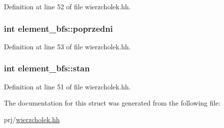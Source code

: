 \-Definition at line 52 of file wierzcholek.\-hh.

\hypertarget{structelement__bfs_a94b882f6922be485d6942f71c29e581d}{
\subsubsection[{poprzedni}]{\setlength{\rightskip}{0pt plus 5cm}int {\bf element\-\_\-bfs\-::poprzedni}}}\label{structelement__bfs_a94b882f6922be485d6942f71c29e581d}


\-Definition at line 53 of file wierzcholek.\-hh.

\hypertarget{structelement__bfs_aa654df64808f513f41d0349571e4b90e}{
\subsubsection[{stan}]{\setlength{\rightskip}{0pt plus 5cm}int {\bf element\-\_\-bfs\-::stan}}}\label{structelement__bfs_aa654df64808f513f41d0349571e4b90e}


\-Definition at line 51 of file wierzcholek.\-hh.



\-The documentation for this struct was generated from the following file\-:\begin{DoxyCompactItemize}
\item 
prj/\hyperlink{wierzcholek_8hh}{wierzcholek.\-hh}\end{DoxyCompactItemize}
